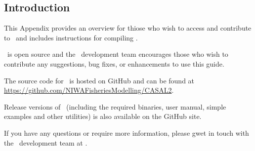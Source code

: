 \subsection{Introduction\label{AppendixA:Introduction}}

This Appendix provides an overview for thiose who wish to access and contribute to \CNAME\ and includes instructions for compiling \CNAME. 

\CNAME\ is open source and the \CNAME\ development team encourages those who wish to contribute any suggestions, bug fixes, or enhancements to use this guide. 

The source code for \CNAME\ is hosted on GitHub and can be found at \url{https://github.com/NIWAFisheriesModelling/CASAL2}.

Release versions of \CNAME\ (including the required binaries, user manual, simple examples and other utilities) is also available on the GitHub site.

If you have any questions or require more information, please gwet in touch with the \CNAME\ development team at \email.


